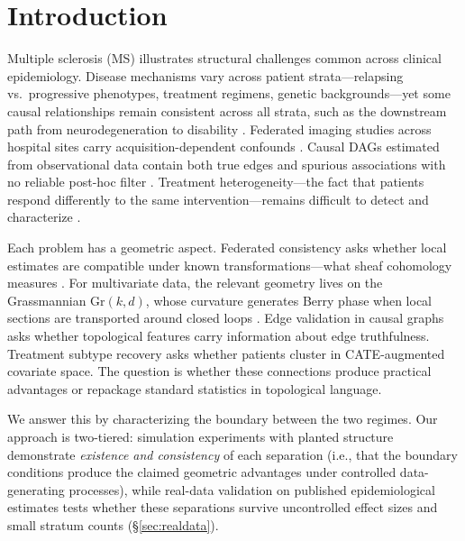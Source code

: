 \documentclass{article}
\newcommand{\Gr}{\mathrm{Gr}}
\begin{document}
\section{Introduction}
\label{sec:intro}

Multiple sclerosis (MS) illustrates structural challenges common across clinical epidemiology.
Disease mechanisms vary across patient strata---relapsing vs.\ progressive phenotypes, treatment regimens, genetic backgrounds---yet some causal relationships remain consistent across all strata, such as the downstream path from neurodegeneration to disability \citep{lublin2014defining}.
Federated imaging studies across hospital sites carry acquisition-dependent confounds \citep{fortin2018harmonization}.
Causal DAGs estimated from observational data contain both true edges and spurious associations with no reliable post-hoc filter \citep{glymour2019review}.
Treatment heterogeneity---the fact that patients respond differently to the same intervention---remains difficult to detect and characterize \citep{athey2016recursive}.

Each problem has a geometric aspect.
Federated consistency asks whether local estimates are compatible under known transformations---what sheaf cohomology measures \citep{robinson2014topological, curry2014sheaves}.
For multivariate data, the relevant geometry lives on the Grassmannian $\Gr(k,d)$, whose curvature generates Berry phase when local sections are transported around closed loops \citep{berry1984quantal, simon1983holonomy}.
Edge validation in causal graphs asks whether topological features carry information about edge truthfulness.
Treatment subtype recovery asks whether patients cluster in CATE-augmented covariate space.
The question is whether these connections produce practical advantages or repackage standard statistics in topological language.

We answer this by characterizing the boundary between the two regimes.
Our approach is two-tiered: simulation experiments with planted structure demonstrate \emph{existence and consistency} of each separation (i.e., that the boundary conditions produce the claimed geometric advantages under controlled data-generating processes), while real-data validation on published epidemiological estimates tests whether these separations survive uncontrolled effect sizes and small stratum counts (\S\ref{sec:realdata}).
\end{document}
